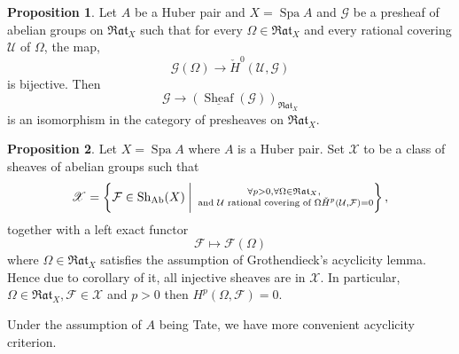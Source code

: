 \documentclass[10pt]{article}
\numberwithin{equation}{section}
\theoremstyle{definition}
\newtheorem{proposition}{Proposition}[subsection]
\DeclareMathOperator{\Spa}{Spa}
\DeclareMathOperator{\Sheaf}{Sheaf}
\newcommand{\cF}[0]{\mathcal{F}}
\newcommand{\Rat}[0]{\mathfrak{Rat}}
\begin{document}
\begin{proposition}
    \label{proposition_24_3}
    Let $A$ be a Huber pair and $X=\Spa A$ and $\mathcal{G}$ be a presheaf of abelian groups on $\Rat_X$ such that for every $\Omega\in\Rat_X$ and every rational covering $\mathcal{U}$ of $\Omega$, the map,
    \begin{equation*}
        \mathcal{G}(\Omega)\to \check{H}^0(\mathcal{U},\mathcal{G})
    \end{equation*}
    is bijective. Then
    \begin{equation*}
        \mathcal{G}\to(\underline{\Sheaf}(\mathcal{G}))_{\Rat_X}
    \end{equation*}
    is an isomorphism in the category of presheaves on $\Rat_X$.
\end{proposition}

\begin{proposition}
    Let $X=\Spa A$ where $A$ is a Huber pair. Set $\mathscr{X}$ to be a class of sheaves of abelian groups such that
    \begin{equation*}
    \mathscr{X} = \left\{\cF\in\mathrm{Sh}_{\mathrm{Ab}}(X)\:\bigg{\vert}\:\substack{\forall p>0, \forall \Omega\in\Rat_X, \\\text{ and $\mathcal{U}$ rational covering of $\Omega$} \check{H}^p(\mathcal{U},\mathcal{F}) = 0}\right\},
    \end{equation*}
    together with a left exact functor
    \begin{equation*}
        \mathcal{F}\mapsto\mathcal{F}(\Omega)
    \end{equation*}
    where $\Omega\in\Rat_X$ satisfies the assumption of Grothendieck's acyclicity lemma. Hence due to corollary of it, all injective sheaves are in $\mathscr{X}$. In particular, $\Omega\in\Rat_X,\mathcal{F}\in\mathscr{X}$ and $p>0$ then $H^p(\Omega,\mathcal{F})=0$.
\end{proposition}

Under the assumption of $A$ being Tate, we have more convenient acyclicity criterion.
\end{document}
